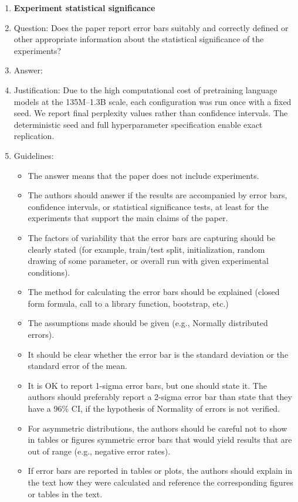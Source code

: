 \documentclass{article}
\begin{document}
\begin{enumerate}
\item {\bf Experiment statistical significance}
    \item[] Question: Does the paper report error bars suitably and correctly defined or other appropriate information about the statistical significance of the experiments?
    \item[] Answer: \answerNo{}
    \item[] Justification: Due to the high computational cost of pretraining language models at the 135M--1.3B scale, each configuration was run once with a fixed seed. We report final perplexity values rather than confidence intervals. The deterministic seed and full hyperparameter specification enable exact replication.
    \item[] Guidelines:
    \begin{itemize}
        \item The answer \answerNA{} means that the paper does not include experiments.
        \item The authors should answer \answerYes{} if the results are accompanied by error bars, confidence intervals, or statistical significance tests, at least for the experiments that support the main claims of the paper.
        \item The factors of variability that the error bars are capturing should be clearly stated (for example, train/test split, initialization, random drawing of some parameter, or overall run with given experimental conditions).
        \item The method for calculating the error bars should be explained (closed form formula, call to a library function, bootstrap, etc.)
        \item The assumptions made should be given (e.g., Normally distributed errors).
        \item It should be clear whether the error bar is the standard deviation or the standard error of the mean.
        \item It is OK to report 1-sigma error bars, but one should state it. The authors should preferably report a 2-sigma error bar than state that they have a 96\% CI, if the hypothesis of Normality of errors is not verified.
        \item For asymmetric distributions, the authors should be careful not to show in tables or figures symmetric error bars that would yield results that are out of range (e.g., negative error rates).
        \item If error bars are reported in tables or plots, the authors should explain in the text how they were calculated and reference the corresponding figures or tables in the text.
    \end{itemize}


\end{enumerate}
\end{document}
